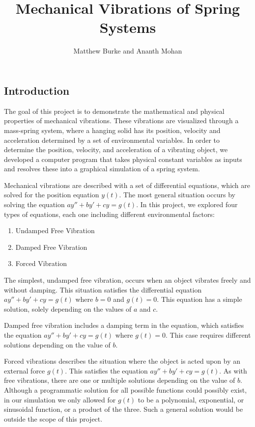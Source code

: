 \documentclass[11pt]{article} %
\title{Mechanical Vibrations of Spring Systems}
\author{Matthew Burke and Ananth Mohan}
\begin{document}
\maketitle

\begin{multicols}{2}

\begin{flushleft}
\section{Introduction}

The goal of this project is to demonstrate the mathematical and physical properties of mechanical vibrations. These vibrations are visualized through a mass-spring system, where a hanging solid has its position, velocity and acceleration determined by a set of environmental variables. In order to determine the position, velocity, and acceleration of a vibrating object, we developed a computer program that takes physical constant variables as inputs and resolves these into a graphical simulation of a spring system.

Mechanical vibrations are described with a set of differential equations, which are solved for the position equation $y(t)$. The most general situation occurs by solving the equation $ay'' + by' + cy = g(t)$. In this project, we explored four types of equations, each one including different environmental factors:

\begin{enumerate}
	\item Undamped Free Vibration

	\item Damped Free Vibration

	\item Forced Vibration

\end{enumerate} 

The simplest, undamped free vibration, occurs when an object vibrates freely and without damping. This situation satisfies the differential equation $ay'' + by' + cy = g(t)$ where $b = 0$ and $g(t) = 0$. This equation has a simple solution, solely depending on the values of $a$ and $c$.

Damped free vibration includes a damping term in the equation, which satisfies the equation $ay'' + by' + cy = g(t)$ where $g(t) = 0$. This case requires different solutions depending on the value of $b$.

Forced vibrations describes the situation where the object is acted upon by an external force $g(t)$. This satisfies the equation $ay'' + by' + cy = g(t)$. As with free vibrations, there are one or multiple solutions depending on the value of $b$. Although a programmatic solution for all possible functions could possibly exist, in our simulation we only allowed for $g(t)$ to be a polynomial, exponential, or sinusoidal function, or a product of the three. Such a general solution would be outside the scope of this project.


\end{flushleft}
\end{multicols}
\end{document}
